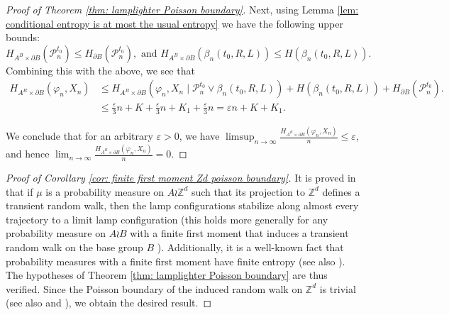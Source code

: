 \documentclass[reqno,oneside,11pt]{amsart}
\newcommand{\Z}{\mathbb{Z}}
\theoremstyle{plain}
\theoremstyle{definition}
\begin{document}
\begin{proof}[Proof of Theorem \ref{thm: lamplighter Poisson boundary}]
	Next, using Lemma \ref{lem: conditional entropy is at most the usual entropy} we have the following upper bounds: 
	\begin{equation*}
		H_{A^B\times \partial B}(\mathcal{P}_n^{t_0})\le H_{\partial B}(\mathcal{P}_n^{t_0}), \text{ and }H_{A^B\times \partial B}\left(\beta_n(t_0,R,L)\right)\le H\left(\beta_n(t_0,R,L)\right).
	\end{equation*}
	Combining this with the above, we see that
	\begin{align*}
		H_{A^B\times \partial B}\left(\varphi_n,X_n	\right)&\le H_{A^B\times \partial B}\left(\varphi_n,X_n \mid \mathcal{P}_n^{t_0}\vee \beta_n(t_0,R,L)\right)+H\left(\beta_n(t_0,R,L)\right)+H_{\partial B}(\mathcal{P}_n^{t_0}).\\
		&\le \frac{\varepsilon}{3}n+K+\frac{\varepsilon}{3}n+K_1+\frac{\varepsilon}{3}n=\varepsilon n+K+K_1.
	\end{align*}
	
	We conclude that for an arbitrary $\varepsilon>0$, we have $\limsup_{n\to \infty} \frac{H_{A^B\times \partial B}\left(\varphi_n,X_n	\right)}{n}\le\varepsilon$, and hence $
		\lim_{n\to \infty} \frac{H_{A^B\times \partial B}\left(\varphi_n,X_n	\right)}{n}=0.$
\end{proof}

\begin{proof}[Proof of Corollary \ref{cor: finite first moment Zd poisson boundary}]
	It is proved in \cite[Theorem 3.3]{Kaimanovich1991} that if $\mu$ is a probability measure on $A\wr \Z^d$ such that its projection to $\Z^d$ defines a transient random walk, then the lamp configurations stabilize along almost every trajectory to a limit lamp configuration (this holds more generally for any probability measure on $A\wr B$ with a finite first moment that induces a transient random walk on the base group $B$ \cite[Lemma 1.1]{Erschler2011}). Additionally, it is a well-known fact that probability measures with a finite first moment have finite entropy \cite{Derriennic1986} (see also \cite[Lemma 2.2.2]{Kaimanovich2001}). The hypotheses of Theorem \ref{thm: lamplighter Poisson boundary} are thus verified. Since the Poisson boundary of the induced random walk on $\Z^d$ is trivial \cite{Blackwell1955} (see also \cite{DoobSnellWilliamson1960} and \cite{ChoquetDeny1960}), we obtain the desired result.
\end{proof}
\end{document}
